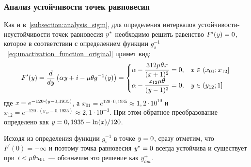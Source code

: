 \subsubsection{Анализ устойчивости точек равновесия}

Как и в~\autoref{subsection:analysis_sigm}, для определения интервалов устойчивости-неустойчивости точек равновесия $\mathit{y}^{*}$ необходимо решить равенство $F^{\prime}(\mathit{y}) = 0$, которое в соответствии с определением функции $g^{-1}_{s}$~\eqref{eq:unactivation_function_original} примет вид:
\begin{equation}
\nonumber
    F^{\prime}(\mathit{y}) = \dfrac{d}{d\mathit{y}}\left( \alpha \mathit{y} + \mathit{i} - \mu \theta g^{-1}(\mathit{y}) \right) = 
    \begin{cases}
        \alpha - \dfrac{312 \mu \theta \mathit{x}}{(\mathit{x} + 1)^{2}} = 0,   & \mathit{x} \in \left(x_{01}; x_{12}\right] \\
        \alpha - \dfrac{z_{12} \mu \theta}{(\mathit{y} - 1)^{2}} = 0,           & \mathit{y} \in \left(y_{12}; 1\right] \\
    \end{cases}
\end{equation}
где $\mathit{x} = e^{-120 \cdot (\mathit{y} - 0,1935)}$, а $x_{01} = e^{120 \cdot 0,1935} \approx 1,2 \cdot 10^{10}$ и $x_{12} = e^{-120 \cdot (y_{12} - 0,1935)} \approx 2,1 \cdot 10^{-3}$. При этом обратное преобразование определено как $\mathit{y} = 0,1935 - \ln(\mathit{x}) / 120$.

Исходя из определения функции $g^{-1}_{s}$ в точке $\mathit{y} = 0$, сразу отметим, что $F^{\prime}(0) = -\infty$ и поэтому точка равновесия $\mathit{y}^{*} = 0$ всегда устойчива и существует при $\mathit{i} < \mu \theta u_{01}$ --- обозначим это решение как $y_{low}^{+}$.

